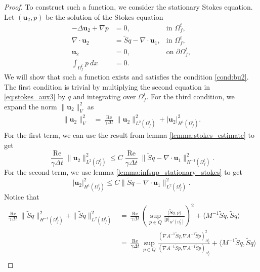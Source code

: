 \documentclass{article}
\newcommand{\bu}{{\mathbf{u}}}
\newcommand{\Reynolds}{{\operatorname{Re}}}
\begin{document}
\begin{proof}
    To construct such a function, we consider the stationary Stokes equation. Let $(\bu_2,p)$ be the solution of the Stokes equation
    \begin{equation}\label{eq:stokes_aux3}
        \begin{aligned}
            -\Delta \bu_2 + \nabla p &= 0, &\text{in }\Omega_f^t,\\
            \nabla\cdot\bu_2 &= \tilde{S}q - \nabla\cdot\bu_1, &\text{in }\Omega_f^t,\\
            \bu_2 &= 0, &\text{on }\partial\Omega_f^t,\\
            \int_{\Omega_f^t} p \ dx &= 0.
        \end{aligned}
    \end{equation}
    We will show that such a function exists and satisfies the condition \eqref{cond:bu2}. 
    The first condition is trivial by multiplying the second equation in \eqref{eq:stokes_aux3} by $q$ and integrating over $\Omega_f^t$. For the third condition, we expand the norm $\|\bu_2\|_V^2$ as
    \begin{equation}
        \begin{aligned}
            \|\bu_2\|_V^2 &= \frac{\Reynolds}{\gamma\Delta t}\|\bu_2\|_{L^2(\Omega_f^t)}^2 + |\bu_2|_{H^1(\Omega_f^t)}^2.
        \end{aligned}
    \end{equation}
    For the first term, we can use the result from lemma \ref{lemma:stokes_estimate} to get
    \begin{equation}
        \frac{\Reynolds}{\gamma\Delta t}\|\bu_2\|_{L^2(\Omega_f^t)}^2\leq C \frac{\Reynolds}{\gamma \Delta t}\|\tilde{S}q-\nabla\cdot \bu_1\|_{H^{-1}(\Omega_f^t)}^2.
    \end{equation}
    For the second term, we use lemma \ref{lemma:infsup_stationary_stokes} to get
    \begin{equation}
        |\bu_2|_{H^1(\Omega_f^t)}^2\leq C\|\tilde{S}q - \nabla\cdot\bu_1\|_{L^2(\Omega_f^t)}^2.
    \end{equation}
    Notice that 
    \begin{equation}
        \begin{aligned}
            \frac{\Reynolds}{\gamma\Delta t}\|\tilde{S}q\|_{H^{-1}(\Omega_f^t)}^2 + \|\tilde{S}q\|_{L^2(\Omega_f^t)}^2 &= \frac{\Reynolds}{\gamma\Delta t}(\sup_{ p\in Q}\frac{\langle\tilde{S}q,p\rangle}{|p|_{H^1(\Omega_f^t)}})^2 + \langle M^{-1}\tilde{S}q,\tilde{S}q\rangle\\
            & = \frac{\Reynolds}{\gamma\Delta t}\sup_{ p\in Q}\frac{(\nabla A^{-1}\tilde{S}q,\nabla A^{-1}\tilde{S}p)_{\Omega_f^t}^2}{(\nabla A^{-1}\tilde{S}p,\nabla A^{-1}\tilde{S}p)_{\Omega_f^t}} + \langle M^{-1}\tilde{S}q,\tilde{S}q\rangle\\

\end{aligned}
\end{equation}
\end{proof}
\end{document}

